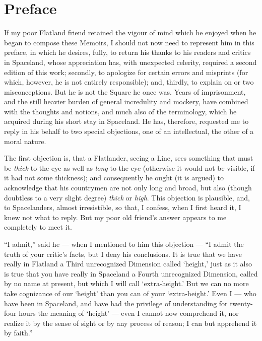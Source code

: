\documentclass[10pt, kindle, oneside]{kindle}
\begin{document}
\chapter*{Preface}


If my poor Flatland friend retained the vigour of mind which he enjoyed when
he began to compose these Memoirs, I should not now need to represent him in
this preface, in which he desires, fully, to return his thanks to his readers
and critics in Spaceland, whose appreciation has, with unexpected celerity,
required a second edition of this work; secondly, to apologize for certain
errors and misprints (for which, however, he is not entirely responsible);
and, thirdly, to explain on or two misconceptions. But he is not the Square he
once was. Years of imprisonment, and the still heavier burden of general
incredulity and mockery, have combined with the thoughts and notions, and much
also of the terminology, which he acquired during his short stay in Spaceland.
He has, therefore, requested me to reply in his behalf to two special
objections, one of an intellectual, the other of a moral nature.

The first objection is, that a Flatlander, seeing a Line, sees something that
must be \emph{thick} to the eye as well as \emph{long} to the eye (otherwise it would not be
visible, if it had not some thickness); and consequently he ought (it is
argued) to acknowledge that his countrymen are not only long and broad, but
also (though doubtless to a very slight degree) \emph{thick} or \emph{high}. This objection
is plausible, and, to Spacelanders, almost irresistible, so that, I confess,
when I first heard it, I knew not what to reply. But my poor old friend's
answer appears to me completely to meet it.

``I admit,'' said he --- when I mentioned to him this objection --- ``I admit the
truth of your critic's facts, but I deny his conclusions. It is true that we
have really in Flatland a Third unrecognized Dimension called `height,' just
as it also is true that you have really in Spaceland a Fourth unrecognized
Dimension, called by no name at present, but which I will call `extra-height.'
But we can no more take cognizance of our `height' than you can of your
`extra-height.' Even I --- who have been in Spaceland, and have had the
privilege of understanding for twenty-four hours the meaning of `height' ---
even I cannot now comprehend it, nor realize it by the sense of sight or by
any process of reason; I can but apprehend it by faith.''
\end{document}
